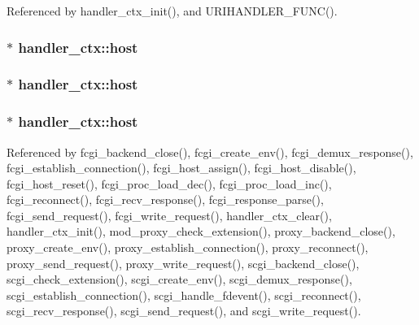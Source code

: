 Referenced by handler\-\_\-ctx\-\_\-init(), and U\-R\-I\-H\-A\-N\-D\-L\-E\-R\-\_\-\-F\-U\-N\-C().

\hypertarget{structhandler__ctx_a8b29717d9d3238a7d971ebbbb6c05cb8}{
\subsubsection[{host}]{$\ast$ handler\-\_\-ctx\-::host}}\label{structhandler__ctx_a8b29717d9d3238a7d971ebbbb6c05cb8}
\hypertarget{structhandler__ctx_ab891690867b39c474b01611d885f4633}{
\subsubsection[{host}]{$\ast$ handler\-\_\-ctx\-::host}}\label{structhandler__ctx_ab891690867b39c474b01611d885f4633}
\hypertarget{structhandler__ctx_ab2146df10f86440b0de1b96a1bac6f73}{
\subsubsection[{host}]{$\ast$ handler\-\_\-ctx\-::host}}\label{structhandler__ctx_ab2146df10f86440b0de1b96a1bac6f73}


Referenced by fcgi\-\_\-backend\-\_\-close(), fcgi\-\_\-create\-\_\-env(), fcgi\-\_\-demux\-\_\-response(), fcgi\-\_\-establish\-\_\-connection(), fcgi\-\_\-host\-\_\-assign(), fcgi\-\_\-host\-\_\-disable(), fcgi\-\_\-host\-\_\-reset(), fcgi\-\_\-proc\-\_\-load\-\_\-dec(), fcgi\-\_\-proc\-\_\-load\-\_\-inc(), fcgi\-\_\-reconnect(), fcgi\-\_\-recv\-\_\-response(), fcgi\-\_\-response\-\_\-parse(), fcgi\-\_\-send\-\_\-request(), fcgi\-\_\-write\-\_\-request(), handler\-\_\-ctx\-\_\-clear(), handler\-\_\-ctx\-\_\-init(), mod\-\_\-proxy\-\_\-check\-\_\-extension(), proxy\-\_\-backend\-\_\-close(), proxy\-\_\-create\-\_\-env(), proxy\-\_\-establish\-\_\-connection(), proxy\-\_\-reconnect(), proxy\-\_\-send\-\_\-request(), proxy\-\_\-write\-\_\-request(), scgi\-\_\-backend\-\_\-close(), scgi\-\_\-check\-\_\-extension(), scgi\-\_\-create\-\_\-env(), scgi\-\_\-demux\-\_\-response(), scgi\-\_\-establish\-\_\-connection(), scgi\-\_\-handle\-\_\-fdevent(), scgi\-\_\-reconnect(), scgi\-\_\-recv\-\_\-response(), scgi\-\_\-send\-\_\-request(), and scgi\-\_\-write\-\_\-request().

